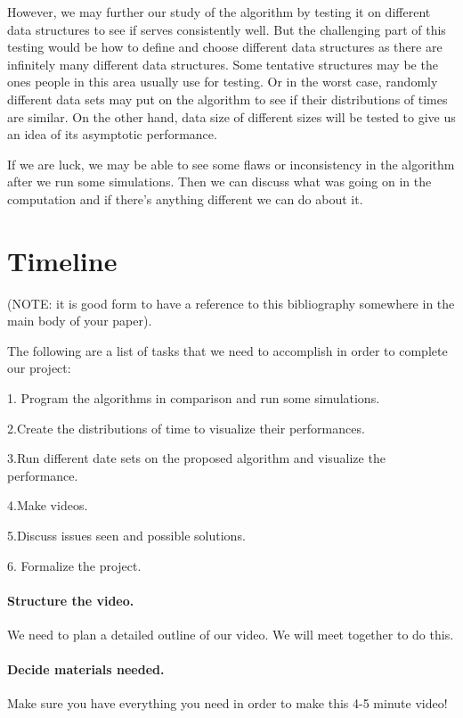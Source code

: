 \documentclass[11pt,twocolumn]{article}
\begin{document}
However, we may further our study of the algorithm by testing it on different data structures to see if serves  consistently well. But the challenging part of this testing would be how to define and choose different data structures as there are infinitely many different data structures. Some tentative structures may be the ones people in this area usually use for testing. Or in the worst case, randomly different data sets  may put on the algorithm to see if their distributions of times are similar. On the other hand, data size of different sizes will be tested to give us an idea of its asymptotic performance. 

If we are luck, we may be able to see some flaws or inconsistency in the algorithm after we run some simulations. Then we can discuss what was going on in the computation and if there's anything different we can do about it.



 

\newpage
\onecolumn
\appendix
\section{Timeline}
(NOTE: it is good form to have a reference to this bibliography somewhere in 
the main body of your paper).

The following are a list of tasks that we need to accomplish in order to 
complete our project:

1. Program the algorithms in comparison and run some simulations.

2.Create the distributions of time to visualize their performances.

3.Run different date sets on the proposed algorithm and visualize the performance.

4.Make videos.

5.Discuss issues seen and possible solutions.

6. Formalize the project.

\paragraph{Structure the video.} We need to plan a detailed outline of our 
video.  We will meet together to do this.

\paragraph{Decide materials needed.}  Make sure you have everything you need in 
order to make this 4-5 minute video!
\end{document}
